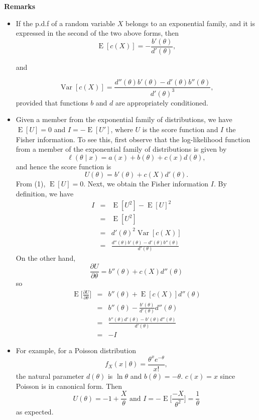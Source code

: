 \documentclass[12pt]{article}
\begin{document}
\textbf{Remarks}
\begin{itemize}
\item If the p.d.f of a random variable $X$ belongs to an exponential family, and it is expressed in the second of the two above forms, then 
\begin{equation}
\operatorname{E}[c(X)]=-\frac{b'(\theta)}{d'(\theta)},
\end{equation}
\begin{center} and \end{center}
\begin{equation}
\operatorname{Var}[c(X)]=\frac{d''(\theta)b'(\theta)-d'(\theta)b''(\theta)}{d'(\theta)^3},
\end{equation}
provided that functions $b$ and $d$ are appropriately conditioned.
\item Given a member from the exponential family of distributions, we have 
$\operatorname{E}[U]=0$ and $I=-\operatorname{E}[U']$, where $U$ is the score function and $I$ the Fisher information.  To see this, first observe that the log-likelihood function from a member of the exponential family of distributions is given by 
$$\ell(\theta\mid x)=a(x)+b(\theta)+c(x)d(\theta),$$
and hence the score function is
$$U(\theta)=b'(\theta)+c(X)d'(\theta).$$
From (1), $\operatorname{E}[U]=0$.  
Next, we obtain the Fisher information $I$.  By definition, we have 
\begin{eqnarray*}
I&=&\operatorname{E}[U^2]-\operatorname{E}[U]^2\\
&=&\operatorname{E}[U^2]\\
&=&d'(\theta)^2\operatorname{Var}[c(X)]\\
&=&\frac{d''(\theta)b'(\theta)-d'(\theta)b''(\theta)}{d'(\theta)}
\end{eqnarray*}
On the other hand, 
$$\frac{\partial U}{\partial\theta}=b''(\theta)+c(X)d''(\theta)$$
so 
\begin{eqnarray*}
\operatorname{E}\Big[\frac{\partial U}{\partial\theta}\Big]
&=&b''(\theta)+\operatorname{E}[c(X)]d''(\theta)\\
&=&b''(\theta)-\frac{b'(\theta)}{d'(\theta)}d''(\theta)\\
&=&\frac{b''(\theta)d'(\theta)-b'(\theta)d''(\theta)}{d'(\theta)}\\
&=&-I
\end{eqnarray*}
\item For example, for a Poisson distribution
$$f_X(x\mid\theta) = \frac{\theta^x e^{-\theta}}{x!},$$
the natural parameter $d(\theta)$ is $\operatorname{ln}\theta$ and $b(\theta)=-\theta$.  $c(x)=x$ since Poisson is in canonical form.  Then $$U(\theta)=-1+\frac{X}{\theta}\mbox{ and }I=-\operatorname{E}\Big[\frac{-X}{\theta^2}\Big]=\frac{1}{\theta}$$ as expected.
\end{itemize}
\end{document}
